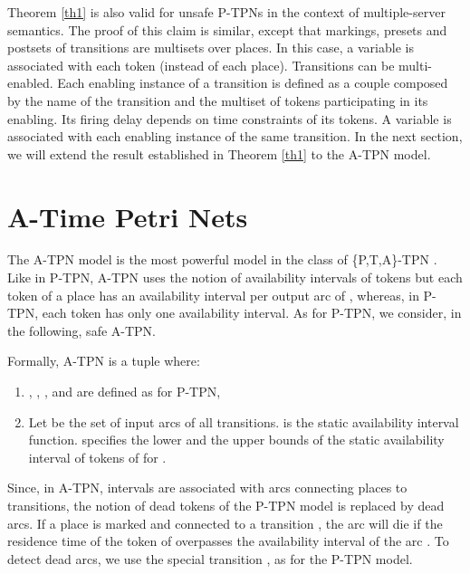 \documentclass[submission,copyright,creativecommons]{eptcs}
\numberwithin{equation}{section}
\begin{document}
\par Theorem \ref{th1} is also valid for unsafe P-TPNs in the context of multiple-server semantics. The proof of this claim is similar, except that markings, presets and postsets of transitions are multisets over places. In this case, a variable is associated with each token (instead of each place). Transitions can be multi-enabled. Each enabling instance of a transition is defined as a couple composed by the name of the transition and the multiset of tokens participating in its enabling. Its firing delay depends on time constraints of its tokens. A variable is associated with each enabling instance of the same transition. In the next section, we will extend the result established in Theorem \ref{th1} to the A-TPN model.

\section{A-Time Petri Nets}
The A-TPN model is the most powerful model in the class of \{P,T,A\}-TPN \cite{boyer-FI-08}. Like in P-TPN, A-TPN uses the notion of availability intervals of tokens but each token of a place  has an availability interval per output arc of , whereas, in P-TPN, each token has only one availability interval. As for P-TPN, we consider, in the following, safe A-TPN.

\par Formally, A-TPN is a tuple  where: \begin{enumerate} \item , , ,  and  are defined as for P-TPN, \item Let  be the set of input arcs of all transitions.  is the static
availability interval function.  specifies the lower 
and the upper  bounds of the static availability
interval of tokens of  for . \end{enumerate}

\par Since, in A-TPN, intervals are associated with arcs connecting places to transitions, the notion of dead tokens of the P-TPN model is replaced by dead arcs. If a place  is marked and connected to a transition , the arc  will die if the residence time of the token of  overpasses the availability interval of the arc . To detect dead arcs, we use the special transition , as for the P-TPN model.
\end{document}
